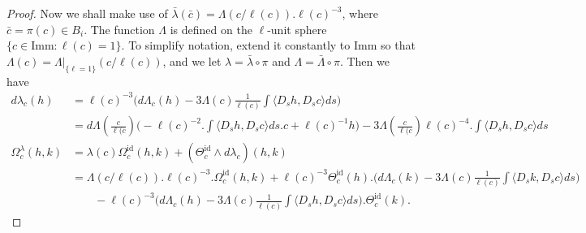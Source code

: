 \documentclass[12pt]{amsart}
\newcommand{\rev}[1]{#1}
\theoremstyle{definition}
\newcommand{\id}{\mathrm{id}}
\newcommand{\Imm}{\mathrm{Imm}}
\def\la{\lambda}
\def\Th{\Theta}
\def\La{\Lambda}
\def\Om{\Omega}
\def\o{\operatorname{\circ}}
\begin{document}
\begin{proof}
Now we shall make use of $\rev{\bar\la}(\bar c)= \La(c/\rev{\ell(c)}).\rev{\ell(c)}^{-3}$, \rev{where $\bar c = \pi(c)\in B_i$.}
The function $\La$ is defined on the $\ell$-unit sphere $\{c\in \Imm: \ell(c) =1\}$. To simplify notation, extend it constantly to $\Imm$ so that $\La(c) = \La|_{\{\ell=1\}}(c/\ell(c))$, \rev{and we let $\la = \bar\la\o \pi$ and $\La = \bar \La\o\pi$}. Then we have
\begin{align}
d\la_c(h) &= \ell(c)^{-3}\Big(d\La_c(h) - 3\La(c)\tfrac1{\ell(c)}\int\langle D_sh,D_sc\rangle ds\Big)
\\&
=d\La(\tfrac{c}{\ell(c})\Big(-\ell(c)^{-2}.\int\langle D_sh,D_sc\rangle ds.c + \ell(c)^{-1}h \Big) -  3\La(\tfrac{c}{\ell(c})\ell(c)^{-4}.\int\langle D_sh,D_sc\rangle ds
\\
\Om^\la_c(h,k) &= \la(c)\Om^\id_c(h,k) + (\Th^\id_c\wedge d\la_c)(h,k) 
\\&
= \La(c/\ell(c)).\ell(c)^{-3}.\Om^\id_c(h,k) 
+ \ell(c)^{-3}\Th^\id_c(h).\Big(d\La_c(k) - 3\La(c)\tfrac1{\ell(c)}\int\langle D_sk,D_sc\rangle ds\Big)
\\&\qquad
- \ell(c)^{-3}\Big(d\La_c(h) - 3\La(c)\tfrac1{\ell(c)}\int\langle D_sh,D_sc\rangle ds\Big).\Th^\id_c(k).
\end{align}


\end{proof}
\end{document}
